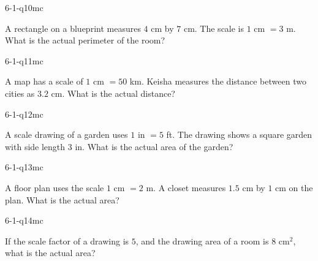 \begin{practiceQuestion}{6-1-q10}{mc}
\begin{questionText}
A rectangle on a blueprint measures $4$ cm by $7$ cm. The scale is $1$ cm $= 3$ m. What is the actual perimeter of the room?
\end{questionText}
\end{practiceQuestion}

\begin{practiceQuestion}{6-1-q11}{mc}
\begin{questionText}
A map has a scale of $1$ cm $= 50$ km. Keisha measures the distance between two cities as $3.2$ cm. What is the actual distance?
\end{questionText}
\end{practiceQuestion}

\begin{practiceQuestion}{6-1-q12}{mc}
\begin{questionText}
A scale drawing of a garden uses $1$ in $= 5$ ft. The drawing shows a square garden with side length $3$ in. What is the actual area of the garden?
\end{questionText}
\end{practiceQuestion}

\begin{practiceQuestion}{6-1-q13}{mc}
\begin{questionText}
A floor plan uses the scale $1$ cm $= 2$ m. A closet measures $1.5$ cm by $1$ cm on the plan. What is the actual area?
\end{questionText}
\end{practiceQuestion}

\begin{practiceQuestion}{6-1-q14}{mc}
\begin{questionText}
If the scale factor of a drawing is $5$, and the drawing area of a room is $8$ cm$^2$, what is the actual area?
\end{questionText}
\end{practiceQuestion}

